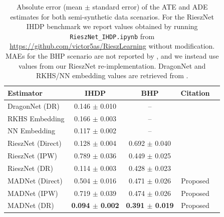 \begin{table}[ht]
\centering
\caption{Absolute error (mean $\pm$ standard error) of the ATE and ADE estimates for both semi-synthetic data scenarios. %
For the RieszNet IHDP benchmark 
we report values obtained by running \texttt{RieszNet\_IHDP.ipynb} from \url{https://github.com/victor5as/RieszLearning} without modification. 
MAEs for the BHP scenario are not reported by \cite{Chernozhukov2022}, and we instead use values from our RieszNet re-implementation. %
DragonNet and RKHS/NN embedding values are retrieved from \citet[Table~1]{Xu2022}.}
\label{tab:ate-mae}
\begin{tabular}{@{}lcccc@{}}
\toprule
Estimator         & IHDP              & BHP              & Citation                 \\ \midrule
DragonNet (DR)        & 0.146 $\pm$ 0.010 & -- & \citep{Shi2019}          \\
RKHS Embedding    & 0.166 $\pm$ 0.003 & -- & \citep{Singh2023}        \\
NN Embedding      & 0.117 $\pm$ 0.002 & -- & \citep{Xu2022}           \\
RieszNet (Direct) & 0.128 $\pm$ 0.004 & 0.692 $\pm$ 0.040 & \citep{Chernozhukov2022} \\
RieszNet (IPW)    & 0.789 $\pm$ 0.036 & 0.449 $\pm$ 0.025 & \citep{Chernozhukov2022} \\
RieszNet (DR)     & 0.114 $\pm$ 0.003 & 0.428 $\pm$ 0.023 & \citep{Chernozhukov2022} \\
MADNet (Direct) & 0.504 $\pm$ 0.016 & 0.471 $\pm$ 0.026 & Proposed   \\
MADNet (IPW)    & 0.719 $\pm$ 0.039 & 0.474 $\pm$ 0.026 & Proposed   \\
MADNet (DR)     & \textbf{0.094 $\pm$ 0.002} & \textbf{0.391 $\pm$ 0.019} & Proposed   \\
\bottomrule
\end{tabular}
\end{table}

